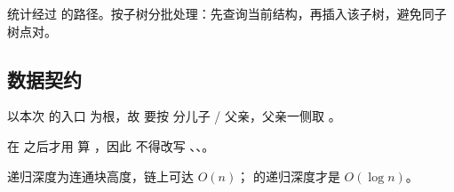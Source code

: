  统计经过  的路径。按子树分批处理：先查询当前结构，再插入该子树，避免同子树点对。

\subsection{数据契约}

 以本次  的入口  为根，故  要按  分儿子 / 父亲，父亲一侧取 。

 在  之后才用  算 ，因此  不得改写 、、。

 递归深度为连通块高度，链上可达 $O(n)$； 的递归深度才是 $O(\log n)$。
